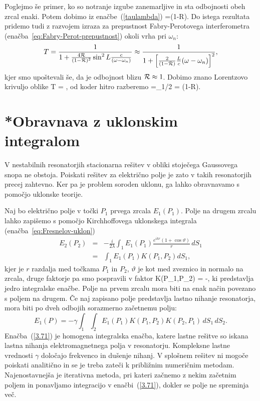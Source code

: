 Poglejmo še primer, ko so notranje izgube zanemarljive in sta odbojnosti obeh zrcal enaki.
Potem dobimo iz enačbe~(\ref{taulambda})
\beq
{}=(1-{\cal R}).
\eeq
Do istega rezultata pridemo tudi z razvojem izraza za prepustnost Fabry-Perotovega 
interferometra (enačba~\ref{eq:Fabry-Perot-prepustnost})
okoli vrha pri $\omega_{n}$:
\begin{equation}
T=\frac{1}{1+\frac{4{\cal R}}{(1-{\cal R})^{2}}\sin^{2}L\frac{c}{(\omega-\omega_{n})}}\approx 
\frac{1}{1+\left[\frac{2}{(1-{\cal R})}\frac{L}{c}(\omega-\omega_{n})\right]^{2}},
\label{3.27}
\end{equation}
 kjer smo upoštevali še, da je odbojnost blizu ${\cal R} \approx 1$. Dobimo znano Lorentzovo
 krivuljo oblike
 \beq
 T = ,
 \eeq
od koder hitro razberemo 
\beq
{}=\Delta\omega_{1/2} = (1-{\cal R}).
\eeq

\section{*Obravnava z uklonskim integralom}
\label{Resonator_uklon}

V nestabilnih resonatorjih stacionarna rešitev v obliki stoječega
Gaussovega snopa ne obstoja. Poiskati rešitev za električno polje je
zato v takih resonatorjih precej zahtevno. 
Ker pa je problem soroden uklonu, ga lahko obravnavamo s pomočjo 
uklonske teorije.

Naj bo električno polje v točki $P_{1}$ prvega zrcala $E_{1}(P_{1})$.
Polje na drugem zrcalu lahko zapišemo s pomočjo Kirchhoffovega uklonskega
integrala (enačba~\ref{eq:Fresnelov-uklon})
\begin{eqnarray}
E_{2}(P_{2}) & = & -\frac{i}{2\lambda}\int_{1}E_{1}(P_{1})\frac{e^{ikr}(1+\cos\vartheta)}{r}\, dS_{1} \\
 & = & \int_{1}E_{1}(P_{1})K(P_{1},P_{2})dS_{1},
\label{eq:resuklon}
\end{eqnarray}
kjer je $r$ razdalja med točkama $P_{1}$ in $P_{2}$, $\vartheta$
je kot med zveznico in normalo na zrcala, druge faktorje pa smo pospravili v faktor
\beq
K(P_{1},P_{2}) = -,
\label{jedro}
\eeq
ki predstavlja jedro integralske enačbe. Polje na prvem zrcalu mora
biti na enak način povezano s poljem na drugem. Če naj zapisano polje predstavlja lastno nihanje
resonatorja, mora biti po dveh odbojih sorazmerno začetnemu polju:
\begin{equation}
E_{1}(P)=-\gamma\int_{1}\int_{2}E_{1}(P_{1})K(P_{1},P_{2})K(P_{2},P_1)\, dS_{1}\, dS_{2}.
\label{3.71}
\end{equation}
Enačba~(\ref{3.71}) je homogena integralska enačba, katere lastne
rešitve so iskana lastna nihanja elektromagnetnega polja v resonatorju.
Kompleksne lastne vrednosti $\gamma$ določajo frekvenco in dušenje
nihanj. V splošnem rešitev ni mogoče poiskati analitično in se je
treba zateči k približnim numeričnim metodam. Najenostavnejša je iterativna
metoda, pri kateri začnemo z nekim začetnim poljem in ponavljamo integracijo
v enačbi~(\ref{3.71}), dokler se polje ne spreminja več.

